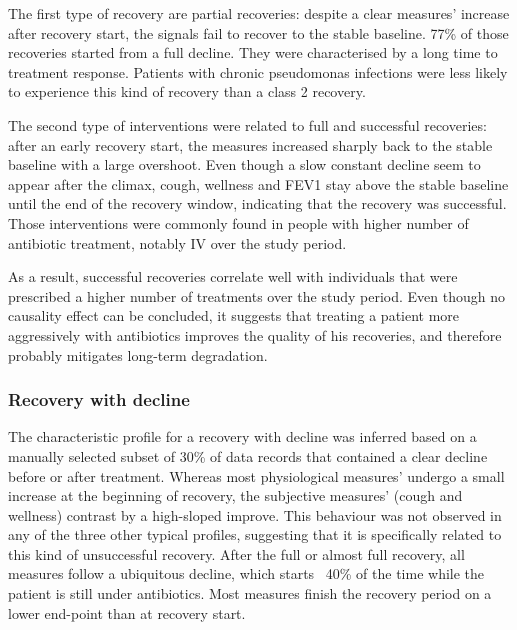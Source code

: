 The first type of recovery are partial recoveries: despite a clear measures' increase after recovery start, the signals fail to recover to the stable baseline. 77\% of those recoveries started from a full decline. They were characterised by a long time to treatment response. Patients with chronic pseudomonas infections were less likely to experience this kind of recovery than a class 2 recovery.

The second type of interventions were related to full and successful recoveries: after an early recovery start, the measures increased sharply back to the stable baseline with a large overshoot. Even though a slow constant decline seem to appear after the climax, cough, wellness and FEV1 stay above the stable baseline until the end of the recovery window, indicating that the recovery was successful. Those interventions were commonly found in people with higher number of antibiotic treatment, notably IV over the study period.

As a result, successful recoveries correlate well with individuals that were prescribed a higher number of treatments over the study period. Even though no causality effect can be concluded, it suggests that treating a patient more aggressively with antibiotics improves the quality of his recoveries, and therefore probably mitigates long-term degradation.

\subsubsection{Recovery with decline}
The characteristic profile for a recovery with decline was inferred based on a manually selected subset of 30\% of data records that contained a clear decline before or after treatment. Whereas most physiological measures' undergo a small increase at the beginning of recovery, the subjective measures' (cough and wellness) contrast by a high-sloped improve. This behaviour was not observed in any of the three other typical profiles, suggesting that it is specifically related to this kind of unsuccessful recovery. After the full or almost full recovery, all measures follow a ubiquitous decline, which starts ~40\% of the time while the patient is still under antibiotics. Most measures finish the recovery period on a lower end-point than at recovery start. 

